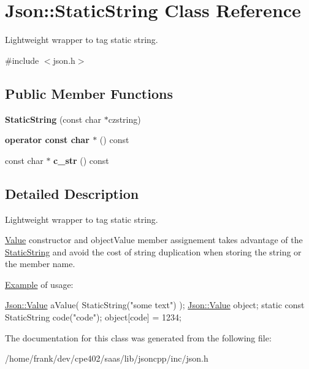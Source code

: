 \hypertarget{class_json_1_1_static_string}{}\section{Json\+:\+:Static\+String Class Reference}
\label{class_json_1_1_static_string}


Lightweight wrapper to tag static string.  




{\ttfamily \#include $<$json.\+h$>$}

\subsection*{Public Member Functions}
\begin{DoxyCompactItemize}
\item 
\hypertarget{class_json_1_1_static_string_afb6baf1ec078ce76f0b0f9b39d19437f}{}{\bfseries Static\+String} (const char $\ast$czstring)\label{class_json_1_1_static_string_afb6baf1ec078ce76f0b0f9b39d19437f}

\item 
\hypertarget{class_json_1_1_static_string_ac2b334d46bbea4c0227e508fc66433e9}{}{\bfseries operator const char $\ast$} () const \label{class_json_1_1_static_string_ac2b334d46bbea4c0227e508fc66433e9}

\item 
\hypertarget{class_json_1_1_static_string_ab86fc6a3183adf12fdba4b370acf1754}{}const char $\ast$ {\bfseries c\+\_\+str} () const \label{class_json_1_1_static_string_ab86fc6a3183adf12fdba4b370acf1754}

\end{DoxyCompactItemize}


\subsection{Detailed Description}
Lightweight wrapper to tag static string. 

\hyperlink{class_json_1_1_value}{Value} constructor and object\+Value member assignement takes advantage of the \hyperlink{class_json_1_1_static_string}{Static\+String} and avoid the cost of string duplication when storing the string or the member name.

\hyperlink{namespace_example}{Example} of usage\+: 
\begin{DoxyCode}
\hyperlink{class_json_1_1_value}{Json::Value} aValue( StaticString(\textcolor{stringliteral}{"some text"}) );
\hyperlink{class_json_1_1_value}{Json::Value} object;
\textcolor{keyword}{static} \textcolor{keyword}{const} StaticString code(\textcolor{stringliteral}{"code"});
\textcolor{keywordtype}{object}[code] = 1234;
\end{DoxyCode}
 

The documentation for this class was generated from the following file\+:\begin{DoxyCompactItemize}
\item 
/home/frank/dev/cpe402/saas/lib/jsoncpp/inc/json.\+h\end{DoxyCompactItemize}
